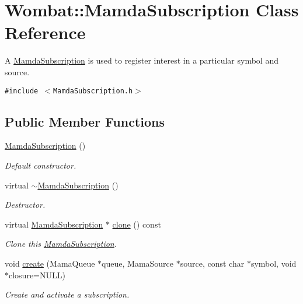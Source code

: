 \hypertarget{classWombat_1_1MamdaSubscription}{
\section{Wombat::Mamda\-Subscription Class Reference}
\label{classWombat_1_1MamdaSubscription}
}
A \hyperlink{classWombat_1_1MamdaSubscription}{Mamda\-Subscription} is used to register interest in a particular symbol and source.  


{\tt \#include $<$Mamda\-Subscription.h$>$}

\subsection*{Public Member Functions}
\begin{CompactItemize}
\item 
\hyperlink{classWombat_1_1MamdaSubscription_ff821c73978e8b6462792aa34daf6fd8}{Mamda\-Subscription} ()
\begin{CompactList}\small\item\em Default constructor. \item\end{CompactList}\item 
virtual \hyperlink{classWombat_1_1MamdaSubscription_a49ec43906c65a1a37b8495047ebeb68}{$\sim$Mamda\-Subscription} ()
\begin{CompactList}\small\item\em Destructor. \item\end{CompactList}\item 
virtual \hyperlink{classWombat_1_1MamdaSubscription}{Mamda\-Subscription} $\ast$ \hyperlink{classWombat_1_1MamdaSubscription_7503a8caad225a4e727bb8ec49cf06a5}{clone} () const 
\begin{CompactList}\small\item\em Clone this \hyperlink{classWombat_1_1MamdaSubscription}{Mamda\-Subscription}. \item\end{CompactList}\item 
void \hyperlink{classWombat_1_1MamdaSubscription_f73189395471119f1cffa620d9ad824e}{create} (Mama\-Queue $\ast$queue, Mama\-Source $\ast$source, const char $\ast$symbol, void $\ast$closure=NULL)
\begin{CompactList}\small\item\em Create and activate a subscription. \item\end{CompactList}\item 

\end{CompactItemize}

